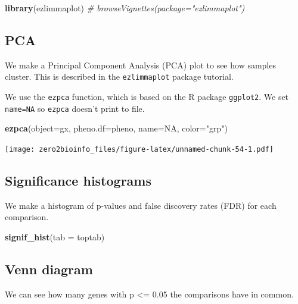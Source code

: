 \documentclass[]{article}
\newenvironment{Shaded}{\begin{snugshade}}{\end{snugshade}}
\newcommand{\KeywordTok}[1]{\textcolor[rgb]{0.13,0.29,0.53}{\textbf{#1}}}
\newcommand{\DataTypeTok}[1]{\textcolor[rgb]{0.13,0.29,0.53}{#1}}
\newcommand{\StringTok}[1]{\textcolor[rgb]{0.31,0.60,0.02}{#1}}
\newcommand{\CommentTok}[1]{\textcolor[rgb]{0.56,0.35,0.01}{\textit{#1}}}
\newcommand{\OtherTok}[1]{\textcolor[rgb]{0.56,0.35,0.01}{#1}}
\newcommand{\NormalTok}[1]{#1}
\begin{document}
\begin{Shaded}
\begin{Highlighting}[]
\KeywordTok{library}\NormalTok{(ezlimmaplot)}
\CommentTok{# browseVignettes(package="ezlimmaplot")}
\end{Highlighting}
\end{Shaded}

\subsection{PCA}\label{pca}

We make a Principal Component Analysis (PCA) plot to see how samples
cluster. This is described in the \texttt{ezlimmaplot} package tutorial.

We use the \texttt{ezpca} function, which is based on the R package
\texttt{ggplot2}. We set \texttt{name=NA} so \texttt{ezpca} doesn't
print to file.

\begin{Shaded}
\begin{Highlighting}[]
\KeywordTok{ezpca}\NormalTok{(}\DataTypeTok{object=}\NormalTok{gx, }\DataTypeTok{pheno.df=}\NormalTok{pheno, }\DataTypeTok{name=}\OtherTok{NA}\NormalTok{, }\DataTypeTok{color=}\StringTok{"grp"}\NormalTok{)}
\end{Highlighting}
\end{Shaded}

\texttt{[image: zero2bioinfo\_files/figure-latex/unnamed-chunk-54-1.pdf]}

\subsection{Significance histograms}\label{significance-histograms}

We make a histogram of p-values and false discovery rates (FDR) for each
comparison.

\begin{Shaded}
\begin{Highlighting}[]
\KeywordTok{signif_hist}\NormalTok{(}\DataTypeTok{tab =}\NormalTok{ toptab)}
\end{Highlighting}
\end{Shaded}

\subsection{Venn diagram}\label{venn-diagram}

We can see how many genes with p \textless{}= 0.05 the comparisons have
in common.
\end{document}
